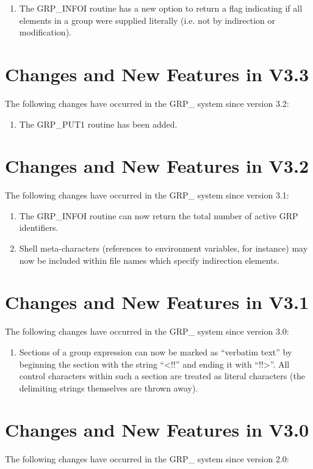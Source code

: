 \begin{enumerate}
\item The GRP\_INFOI routine has a new option to return a flag indicating
if all elements in a group were supplied literally (i.e. not by
indirection or modification).
\end{enumerate}

\section{Changes and New Features in V3.3}
The following changes have occurred in the GRP\_ system since version 3.2:

\begin{enumerate}
\item The GRP\_PUT1 routine has been added.
\end{enumerate}

\section{Changes and New Features in V3.2}
The following changes have occurred in the GRP\_ system since version 3.1:

\begin{enumerate}
\item The GRP\_INFOI routine can now return the total number of active
GRP identifiers.
\item Shell meta-characters (references to environment variables, for
instance) may now be included within file names which specify
indirection elements.

\end{enumerate}

\section{Changes and New Features in V3.1}
The following changes have occurred in the GRP\_ system since version 3.0:

\begin{enumerate}

\item Sections of a group expression can now be marked as ``verbatim text''
by beginning the section with the string ``<!!'' and ending it with
``!!>''. All control characters within such a section are treated as
literal characters (the delimiting strings themselves are thrown away).
\end{enumerate}

\section{Changes and New Features in V3.0}
The following changes have occurred in the GRP\_ system since version 2.0:

